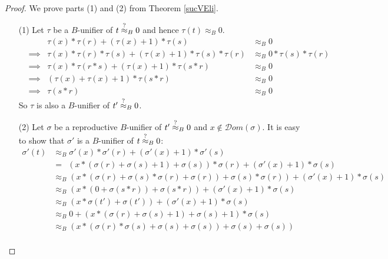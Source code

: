 	\begin{proof} We prove parts (1) and (2) from Theorem \ref{sucVEli}.
		\begin{itemize}
			\item[(1)] Let $\tau$ be a $B$-unifier of $t\stackrel{?}{\approx}_B0$ and hence $\tau(t)\approx_B0$.
			      \begin{align*}
			      	  &          & \tau(x)*\tau(r)+(\tau(x)+1)*\tau(s)                 & \approx_B0                 \\
			      	  & \implies & \tau(x)*\tau(r)*\tau(s)+(\tau(x)+1)*\tau(s)*\tau(r) & \approx_B0*\tau(s)*\tau(r) \\
			      	  & \implies & \tau(x)*\tau(r*s)+(\tau(x)+1)*\tau(s*r)             & \approx_B0                 \\
			      	  & \implies & (\tau(x)+\tau(x)+1)*\tau(s*r)                       & \approx_B0                 \\
			      	  & \implies & \tau(s*r)                                           & \approx_B0                 
			      \end{align*}
			      So $\tau$ is also a $B$-unifier of $t'\stackrel{?}{\approx}_B0$.
			\item[(2)] Let $\sigma$ be a reproductive $B$-unifier of $t'\stackrel{?}{\approx}_B0$ and $x\notin\mathcal{D}om(\sigma)$. It is easy to show that $\sigma'$ is a $B$-unifier of $t\stackrel{?}{\approx}_B0$:
			      \begin{align*}
			      	\sigma'(t) & \approx_B\sigma'(x)*\sigma'(r)+(\sigma'(x)+1)*\sigma'(s)                                            \\
			      	           & =\ \ (x*(\sigma(r)+\sigma(s)+1)+\sigma(s))*\sigma(r)+(\sigma'(x)+1)*\sigma(s)                       \\
			      	           & \approx_B(x*(\sigma(r)+\sigma(s)*\sigma(r)+\sigma(r))+\sigma(s)*\sigma(r))+(\sigma'(x)+1)*\sigma(s) \\
			      	           & \approx_B(x*(0+\sigma(s*r))+\sigma(s*r))+(\sigma'(x)+1)*\sigma(s)                                   \\
			      	           & \approx_B(x*\sigma(t')+\sigma(t'))+(\sigma'(x)+1)*\sigma(s)                                         \\
			      	           & \approx_B0+(x*(\sigma(r)+\sigma(s)+1)+\sigma(s)+1)*\sigma(s)                                        \\
			      	           & \approx_B(x*(\sigma(r)*\sigma(s)+\sigma(s)+\sigma(s))+\sigma(s)+\sigma(s))                          \\

\end{align*}
\end{itemize}
\end{proof}
